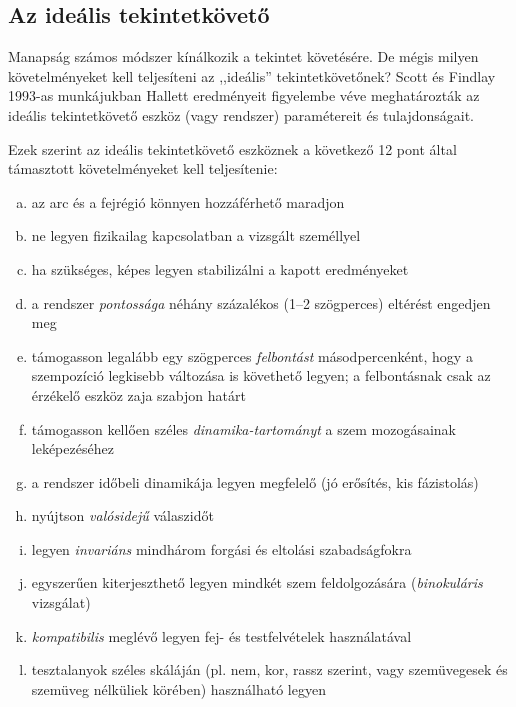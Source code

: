 \subsection{Az ideális tekintetkövető}\label{sect:idealis}

Manapság számos módszer kínálkozik a tekintet követésére. De mégis milyen követelményeket kell teljesíteni az ,,ideális'' tekintetkövetőnek? Scott és Findlay 1993-as munkájukban \cite{scott} Hallett eredményeit \cite{hallett} figyelembe véve meghatározták az ideális tekintetkövető eszköz (vagy rendszer) paramétereit és tulajdonságait.

Ezek szerint az ideális tekintetkövető eszköznek a következő 12 pont által támasztott követelményeket kell teljesítenie:

\begin{enumerate}[a.]
 \item az arc és a fejrégió könnyen hozzáférhető maradjon
 \item ne legyen fizikailag kapcsolatban a vizsgált személlyel
 \item ha szükséges, képes legyen stabilizálni a kapott eredményeket
 \item a rendszer \emph{pontossága} néhány százalékos (1--2 szögperces) eltérést engedjen meg
 \item támogasson legalább egy szögperces \emph{felbontást} másodpercenként, hogy a szempozíció legkisebb változása is követhető legyen; a felbontásnak csak az érzékelő eszköz zaja szabjon határt
 \item támogasson kellően széles \emph{dinamika-tartományt} a szem mozogásainak leképezéséhez
 \item a rendszer időbeli dinamikája legyen megfelelő (jó erősítés, kis fázistolás)
 \item nyújtson \emph{valósidejű} válaszidőt
 \item legyen \emph{invariáns} mindhárom forgási és eltolási szabadságfokra
 \item egyszerűen kiterjeszthető legyen mindkét szem feldolgozására (\emph{binokuláris} vizsgálat)
 \item \emph{kompatibilis} meglévő legyen fej- és testfelvételek használatával
 \item tesztalanyok széles skáláján (pl. nem, kor, rassz szerint, vagy szemüvegesek és szemüveg nélküliek körében) használható legyen
\end{enumerate}

